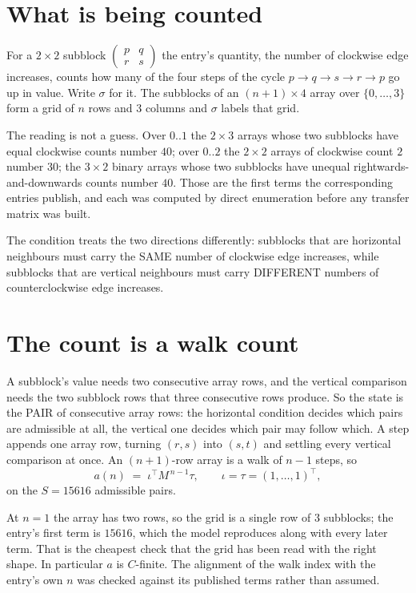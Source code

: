 \documentclass[11pt,a4paper]{article}
\theoremstyle{plain}
\theoremstyle{definition}
\begin{document}
\section{What is being counted}

For a $2\times2$ subblock $\begin{pmatrix}p&q\\r&s\end{pmatrix}$ the
entry's quantity, the number of clockwise edge increases, counts how many of the four steps of the cycle $p\to q\to s\to r\to p$ go up in value. Write $\sigma$ for it. The subblocks of an
$(n+1)\times4$ array over $\{0,\dots,3\}$ form a grid of $n$ rows and $3$
columns and $\sigma$ labels that grid.

The reading is not a guess. Over $0..1$ the $2\times3$ arrays whose two subblocks have equal
clockwise counts number $40$; over $0..2$ the $2\times2$ arrays of clockwise count $2$ number
$30$; the $3\times2$ binary arrays whose two subblocks have unequal rightwards-and-downwards
counts number $40$. Those are the first terms the corresponding entries publish, and each was
computed by direct enumeration before any transfer matrix was built.

The condition treats the two directions differently: subblocks that are horizontal neighbours
must carry the SAME number of clockwise edge increases, while subblocks that are vertical neighbours must carry
DIFFERENT numbers of counterclockwise edge increases.

\section{The count is a walk count}

A subblock's value needs two consecutive array rows, and the vertical
comparison needs the two subblock rows that three consecutive rows produce. So the state is the
PAIR of consecutive array rows: the horizontal condition decides which pairs are admissible at
all, the vertical one decides which pair may follow which. A step appends one array row,
turning $(r,s)$ into $(s,t)$ and settling every vertical comparison at once. An $(n+1)$-row
array is a walk of $n-1$ steps, so
\[
a(n)\;=\;\iota^{\!\top}M^{\,n-1}\tau,\qquad\iota=\tau=(1,\dots,1)^{\!\top},
\]
on the $S=15616$ admissible pairs.

At $n=1$ the array has two rows, so the grid is a single row of $3$
subblocks; the entry's first term is $15616$, which the model
reproduces along with every later term. That is the cheapest check that the grid has been read
with the right shape.
In particular $a$ is $C$-finite. The alignment of the walk index with the entry's own $n$ was
checked against its published terms rather than assumed.
\end{document}
